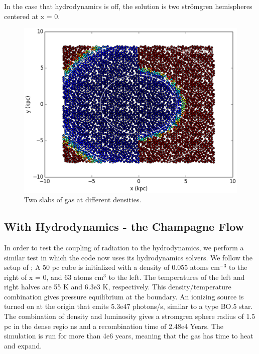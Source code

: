 In the case that hydrodynamics is off, the solution is two str\"omgren hemispheres centered at x = 0.

\begin{figure}
\includegraphics[width=\textwidth]{graphics/gasWall01000HIslice.eps}
\caption[Two slabs of gas at different densities.]{Two slabs of gas at different densities.}
\label{fig:gaswall}
\end{figure}


\subsection{With Hydrodynamics - the Champagne Flow}
\label{sec:champagne}

In order to test the coupling of radiation to the hydrodynamics, we perform a similar test in which the code now uses its hydrodynamics solvers. We follow the setup of \citet{gendelevKrumholz12}; A 50 pc cube is initialized with a density of 0.055 atoms cm$^{-3}$ to the right of x = 0, and 63 atoms cm$^{3}$ to the left. The temperatures of the left and right halves are 55 K and 6.3e3 K, respectively. This density/temperature combination gives pressure equilibrium at the boundary. An ionizing source is turned on at the origin that emits 5.3e47 photons/s, similar to a type BO.5 star. The combination of density and luminosity gives a stromgren sphere radius of 1.5 pc in the dense regio
ns and a recombination time of 2.48e4 Years. The simulation is run for more than 4e6 years, meaning that the gas has time to heat and expand.

